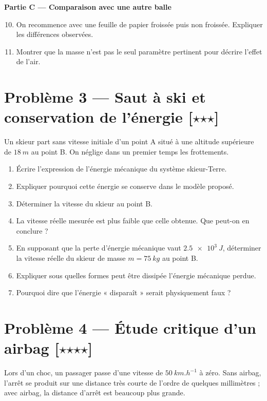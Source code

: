\documentclass[11pt,a4paper]{article}
\newcommand{\etoile}{\ensuremath{\star}}
\begin{document}
\textbf{Partie C --- Comparaison avec une autre balle}
\begin{enumerate}[label=\arabic*)]
    \setcounter{enumi}{9}
    \item On recommence avec une feuille de papier froissée puis non froissée. Expliquer les différences observées.
    \item Montrer que la masse n'est pas le seul paramètre pertinent pour décrire l'effet de l'air.
\end{enumerate}

\section*{Problème 3 --- Saut à ski et conservation de l'énergie \hfill [\etoile\etoile\etoile]}

Un skieur part sans vitesse initiale d'un point A situé à une altitude supérieure de $\SI{18}{m}$ au point B. On néglige dans un premier temps les frottements.

\begin{enumerate}[label=\arabic*)]
    \item Écrire l'expression de l'énergie mécanique du système skieur-Terre.
    \item Expliquer pourquoi cette énergie se conserve dans le modèle proposé.
    \item Déterminer la vitesse du skieur au point B.
    \item La vitesse réelle mesurée est plus faible que celle obtenue. Que peut-on en conclure ?
    \item En supposant que la perte d'énergie mécanique vaut $\SI{2,5e3}{J}$, déterminer la vitesse réelle du skieur de masse $m=\SI{75}{kg}$ au point B.
    \item Expliquer sous quelles formes peut être dissipée l'énergie mécanique perdue.
    \item Pourquoi dire que l'énergie « disparaît » serait physiquement faux ?
\end{enumerate}

\section*{Problème 4 --- Étude critique d'un airbag \hfill [\etoile\etoile\etoile\etoile]}

Lors d'un choc, un passager passe d'une vitesse de $\SI{50}{km.h^{-1}}$ à zéro.
Sans airbag, l'arrêt se produit sur une distance très courte de l'ordre de quelques millimètres ; avec airbag, la distance d'arrêt est beaucoup plus grande.
\end{document}
